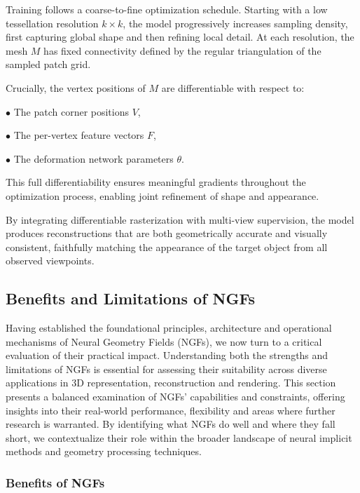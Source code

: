 Training follows a coarse-to-fine optimization schedule.
Starting with a low tessellation resolution $k \times k$, the model progressively increases sampling density, first capturing global shape and then refining local detail.
At each resolution, the mesh $M$ has fixed connectivity defined by the regular triangulation of the sampled patch grid.

Crucially, the vertex positions of $M$ are differentiable with respect to: 

\quad $\bullet$ The patch corner positions $V$,

\quad $\bullet$ The per-vertex feature vectors $F$,

\quad $\bullet$ The deformation network parameters $\theta$.

This full differentiability ensures meaningful gradients throughout the optimization process, enabling joint refinement of shape and appearance.

By integrating differentiable rasterization with multi-view supervision, the model produces reconstructions that are both geometrically accurate and visually consistent, faithfully matching the appearance of the target object from all observed viewpoints.





\subsection{Benefits and Limitations of NGFs}

Having established the foundational principles, architecture and operational mechanisms of Neural Geometry Fields (NGFs), we now turn to a critical evaluation of their practical impact. 
Understanding both the strengths and limitations of NGFs is essential for assessing their suitability across diverse applications in 3D representation, reconstruction and rendering. 
This section presents a balanced examination of NGFs' capabilities and constraints, offering insights into their real-world performance, flexibility and areas where further research is warranted. 
By identifying what NGFs do well and where they fall short, we contextualize their role within the broader landscape of neural implicit methods and geometry processing techniques. 

\subsubsection{Benefits of NGFs}

